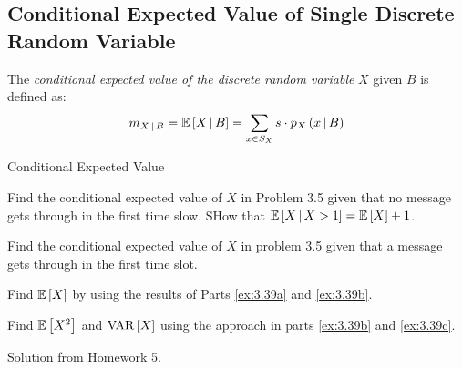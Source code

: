 	\subsection{Conditional Expected Value of Single Discrete Random Variable} \label{subsec:Conditional Expected Value of Single Discrete}
		\begin{definition} \label{def:Conditional Expected Value of Single Discrete}
			The \emph{conditional expected value of the discrete random variable} $X$ given $B$ is defined as:
			\begin{equation} \label{eq:Conditional Expected Value of Single Discrete}
				m_{X \operatorname{\vert} B} = \operatorname{\operatorname{\mathbb{E}}} \left[ X \operatorname{\vert} B \right] = \sum\limits_{x \in S_{X}} s \cdot p_{X} \left( x \operatorname{\vert} B \right)
			\end{equation}
		\end{definition}
		\begin{example}[Problem 3.39]{Conditional Expected Value}
			\begin{boldalphlist}
				\item Find the conditional expected value of $X$ in Problem 3.5 given that no message gets through in the first time slow. SHow that $\operatorname{\operatorname{\mathbb{E}}} \left[ X \operatorname{\vert} X>1 \right] = \operatorname{\operatorname{\mathbb{E}}} \left[ X \right] + 1$. \label{ex:3.39a}
				\item Find the conditional expected value of $X$ in problem 3.5 given that a message gets through in the first time slot. \label{ex:3.39b}
				\item Find $\operatorname{\operatorname{\mathbb{E}}} \left[ X \right]$ by using the results of Parts \ref{ex:3.39a} and \ref{ex:3.39b}. \label{ex:3.39c}
				\item Find $\operatorname{\operatorname{\mathbb{E}}} \left[ X^{2} \right]$ and $\operatorname{\operatorname{VAR}} \left[ X \right]$ using the approach in parts \ref{ex:3.39b} and \ref{ex:3.39c}.
			\end{boldalphlist}
		
			\tcblower
			
			Solution from Homework 5.
		\end{example}
	
